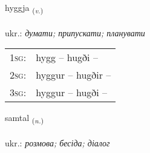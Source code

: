 \documentclass[frontgrid, backgrid]{flacards}\usepackage[]{graphicx}\usepackage[]{xcolor}
\begin{document}
\renewcommand{\flhead}{\vskip5pt \fboxsep=0pt {\small\bfseries\footnotesize Sagnorð | дієслово}}
\renewcommand{\fcfoot}{\vskip5pt \fboxsep=0pt \hspace{2pt}{\small\bfseries\footnotesize 2K}}

\renewcommand{\blhead}{\vskip5pt {\small\bfseries\footnotesize Sagnorð | дієслово }}
\renewcommand{\bcfoot}{\vskip5pt \hspace{2pt}{\small\bfseries\footnotesize 2K}}


{hyggja \small{\textsubscript{(\textit{v.})}} \\[1ex] %
\textphonetic{[hɪca]} \\
ukr.: \emph{думати; припускати; планувати} \\  [2ex]
\renewcommand*{\arraystretch}{0.8}
\begin{tabular}{p{1cm}l}
\textsc{1sg}: & hygg -- hugði --  \\ 
\textsc{2sg}: & hyggur -- hugðir --  \\ 
\textsc{3sg}: & hyggur -- hugði --  \\ 
\end{tabular}
}

\renewcommand{\flhead}{\vskip5pt \fboxsep=0pt {\small\bfseries\footnotesize Nafnorð | іменник}}
\renewcommand{\fcfoot}{\vskip5pt \fboxsep=0pt \hspace{2pt}{\small\bfseries\footnotesize 2K}}

\renewcommand{\blhead}{\vskip5pt {\small\bfseries\footnotesize Nafnorð | іменник }}
\renewcommand{\bcfoot}{\vskip5pt \hspace{2pt}{\small\bfseries\footnotesize 2K}}


{samtal \small{\textsubscript{(\textit{n.})}} \\[1ex] %
\textphonetic{[samtʰal]} \\
ukr.: \emph{розмова; бесіда; діалог} \\  [2ex]
\renewcommand*{\arraystretch}{0.8}
}
\end{document}
